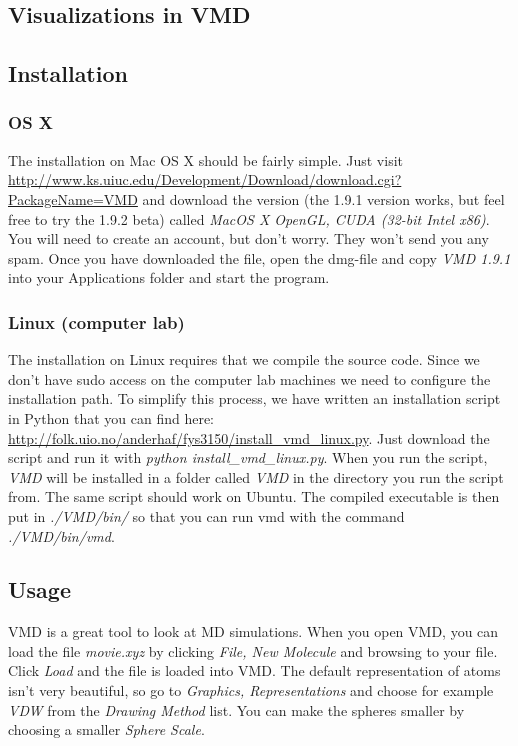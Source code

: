 \documentclass[a4wide,12pt]{article}
\begin{document}
\begin{appendices}
\section{Visualizations in VMD}
\subsection{Installation}
\subsubsection{OS X}
The installation on Mac OS X should be fairly simple. Just visit \url{http://www.ks.uiuc.edu/Development/Download/download.cgi?PackageName=VMD} and download the version (the 1.9.1 version works, but feel free to try the 1.9.2 beta) called \textit{MacOS X OpenGL, CUDA (32-bit Intel x86)}. You will need to create an account, but don't worry. They won't send you any spam. Once you have downloaded the file, open the dmg-file and copy \textit{VMD 1.9.1} into your Applications folder and start the program.
\subsubsection{Linux (computer lab)}
The installation on Linux requires that we compile the source code. Since we don't have sudo access on the computer lab machines we need to configure the installation path. To simplify this process, we have written an installation script in Python that you can find here: \url{http://folk.uio.no/anderhaf/fys3150/install_vmd_linux.py}. Just download the script and run it with \textit{python install\_vmd\_linux.py}. When you run the script, \textit{VMD} will be installed in a folder called \textit{VMD} in the directory you run the script from. The same script should work on Ubuntu. The compiled executable is then put in \textit{./VMD/bin/} so that you can run vmd with the command \textit{./VMD/bin/vmd}.

\subsection{Usage}
VMD is a great tool to look at MD simulations. When you open VMD, you can load the file \textit{movie.xyz} by clicking \textit{File, New Molecule} and browsing to your file. Click \textit{Load} and the file is loaded into VMD. The default representation of atoms isn't very beautiful, so go to \textit{Graphics, Representations} and choose for example \textit{VDW} from the \textit{Drawing Method} list. You can make the spheres smaller by choosing a smaller \textit{Sphere Scale}.

\end{appendices}
\end{document}
